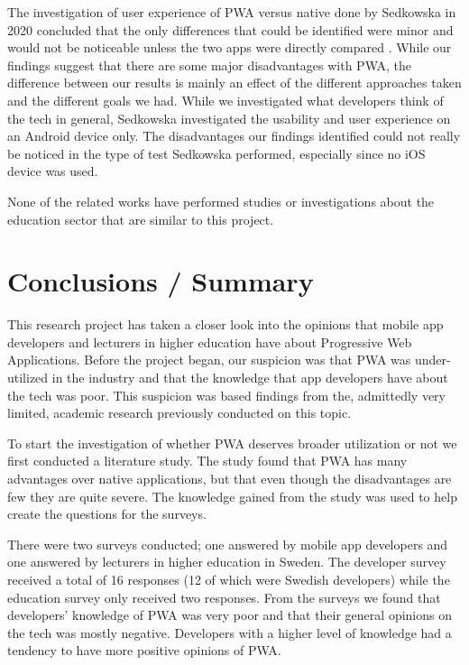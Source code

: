 \documentclass[a4paper,12pt]{article}
\begin{document}
The investigation of user experience of PWA versus native done by Sedkowska in 2020 concluded that the only differences that could be identified were minor and would not be noticeable unless the two apps were directly compared \cite{thesis_pwa_ux}. While our findings suggest that there are some major disadvantages with PWA, the difference between our results is mainly an effect of the different approaches taken and the different goals we had. While we investigated what developers think of the tech in general, Sedkowska investigated the usability and user experience on an Android device only. The disadvantages our findings identified could not really be noticed in the type of test Sedkowska performed, especially since no iOS device was used.

None of the related works have performed  studies or investigations about the education sector that are similar to this project.

\newpage

\section{Conclusions / Summary}
\label{Conclusions}
This research project has taken a closer look into the opinions that mobile app developers and lecturers in higher education have about Progressive Web Applications. Before the project began, our suspicion was that PWA was under-utilized in the industry and that the knowledge that app developers have about the tech was poor. This suspicion was based findings from the, admittedly very limited, academic research previously conducted on this topic.

To start the investigation of whether PWA deserves broader utilization or not we first conducted a literature study. The study found that PWA has many advantages over native applications, but that even though the disadvantages are few they are quite severe. The knowledge gained from the study was used to help create the questions for the surveys.

There were two surveys conducted; one answered by mobile app developers and one answered by lecturers in higher education in Sweden. The developer survey received a total of 16 responses (12 of which were Swedish developers) while the education survey only received two responses. From the surveys we found that developers' knowledge of PWA was very poor and that their general opinions on the tech was mostly negative. Developers with a higher level of knowledge had a tendency to have more positive opinions of PWA.
\end{document}
